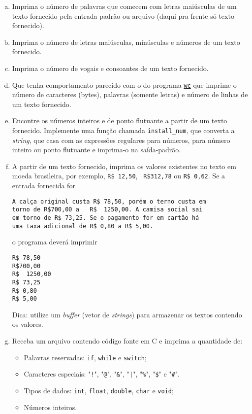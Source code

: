 \begin{enumerate}[a)]
\item Imprima o número de palavras que comecem com letras maiúsculas
  de um texto fornecido pela entrada-padrão ou arquivo (daqui pra
  frente só texto fornecido).

\item Imprima o número de letras maiúsculas, minúsculas e números de
  um texto fornecido.

\item Imprima o número de vogais e consoantes de um texto fornecido.

\item Que tenha comportamento parecido com o do programa
  \href{https://pt.wikipedia.org/wiki/Wc}{\tt wc} que imprime o número
        de caracteres (bytes), palavras (somente letras) 
        e número de linhas de um texto fornecido.

\item Encontre os números inteiros e de ponto flutuante a partir de um 
texto fornecido. Implemente uma função chamada {\tt install\_num}, 
que converta a {\it string\/}, que casa com as expressões regulares para números, 
para número inteiro ou ponto flutuante e imprima-o na saída-padrão.

\item A partir de um texto fornecido, imprima os valores existentes no
  texto em moeda brasileira, por exemplo, {\tt R\$ 12,50}, {\tt
    R\$312,78} ou {\tt R\$ 0,62}.  Se a entrada fornecida for

\begin{verbatim}
A calça original custa R$ 78,50, porém o terno custa em
torno de R$700,00 a   R$  1250,00. A camisa social sai
em torno de R$ 73,25. Se o pagamento for em cartão há
uma taxa adicional de R$ 0,80 a R$ 5,00.
\end{verbatim}

o programa deverá imprimir

\begin{verbatim}
R$ 78,50
R$700,00
R$  1250,00
R$ 73,25
R$ 0,80
R$ 5,00
\end{verbatim}

Dica: utilize um {\it buffer\/} (vetor de {\it strings\/}) para
armazenar os textos contendo os valores.

\item Receba um arquivo contendo código fonte em C e imprima a quantidade de:
\begin{itemize}
    \item Palavras reservadas: {\tt if}, {\tt while} e {\tt switch};
    \item Caracteres especiais: "{\tt !}", "{\tt @}", "{\tt \&}", "{\tt |}", "{\tt \%}", "{\tt \$}" e "{\tt \#}".
    \item Tipos de dados: {\tt int}, {\tt float}, {\tt double}, {\tt char} e {\tt void};
    \item Números inteiros.
  \end{itemize}


\end{enumerate}
